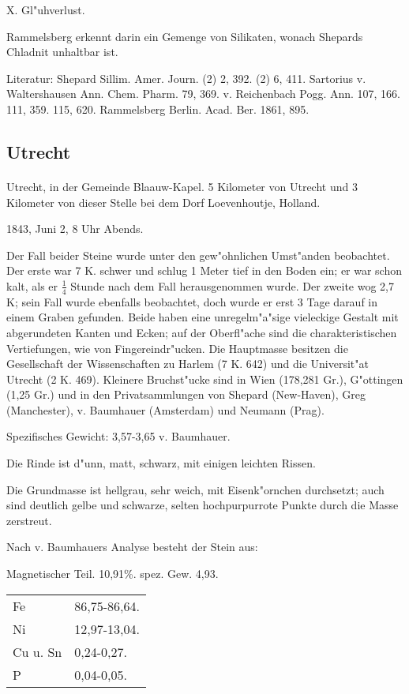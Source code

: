 \documentclass[a4paper, 11pt, oneside]{article}
\begin{document}
X. Gl"uhverlust.

Rammelsberg erkennt darin ein Gemenge von Silikaten, wonach Shepards Chladnit unhaltbar ist.

\footnotesize
Literatur: Shepard Sillim. Amer. Journ. (2) 2, 392. (2) 6, 411. Sartorius v. Waltershausen Ann. Chem. Pharm. 79, 369. v. Reichenbach Pogg. Ann. 107, 166. 111, 359. 115, 620. Rammelsberg Berlin. Acad. Ber. 1861, 895.

\subsection{Utrecht}
\normalsize
\paragraph{}
Utrecht, in der Gemeinde Blaauw-Kapel. 5 Kilometer von Utrecht und 3 Kilometer von dieser Stelle bei dem Dorf Loevenhoutje, Holland.

1843, Juni 2, 8 Uhr Abends.

Der Fall beider Steine wurde unter den gew"ohnlichen Umst"anden beobachtet. Der erste war 7 K. schwer und schlug 1 Meter tief in den Boden ein; er war schon kalt, als er $\frac{1}{4}$ Stunde nach dem Fall herausgenommen wurde. Der zweite wog 2,7 K; sein Fall wurde ebenfalls beobachtet, doch wurde er erst 3 Tage darauf in einem Graben gefunden. Beide haben eine unregelm"a"sige vieleckige Gestalt mit abgerundeten Kanten und Ecken; auf der Oberfl"ache sind die charakteristischen Vertiefungen, wie von Fingereindr"ucken. Die Hauptmasse besitzen die Gesellschaft der Wissenschaften zu Harlem (7 K. 642) und die Universit"at Utrecht (2 K. 469). Kleinere Bruchst"ucke sind in Wien (178,281 Gr.), G"ottingen (1,25 Gr.) und in den Privatsammlungen von Shepard (New-Haven), Greg (Manchester), v. Baumhauer (Amsterdam) und Neumann (Prag).

Spezifisches Gewicht: 3,57-3,65 v. Baumhauer.

Die Rinde ist d"unn, matt, schwarz, mit einigen leichten Rissen.

Die Grundmasse ist hellgrau, sehr weich, mit Eisenk"ornchen durchsetzt; auch sind deutlich gelbe und schwarze, selten hochpurpurrote Punkte durch die Masse zerstreut.

Nach v. Baumhauers Analyse besteht der Stein aus:
\begin{center}
Magnetischer Teil. 10,91\%. spez. Gew. 4,93.
\end{center}
\begin{table}[H]
    \centering
    \begin{tabular}{l l}
        Fe & 86,75-86,64. \\
        Ni & 12,97-13,04. \\
        Cu u. Sn  & 0,24-0,27. \\
        P & 0,04-0,05. \\
    \end{tabular}
\end{table}
\end{document}
